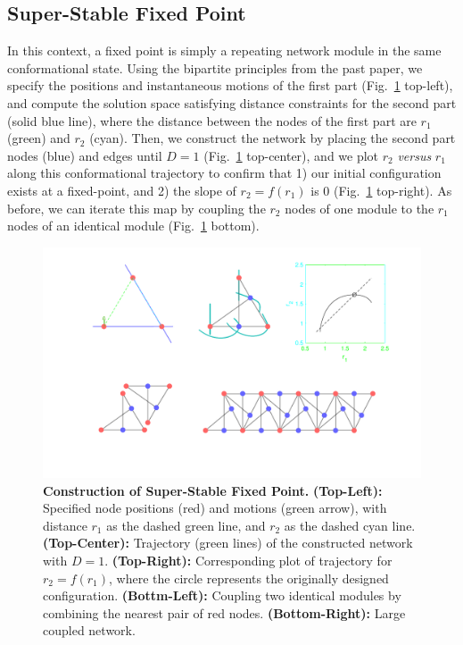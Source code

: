 \documentclass[12pt]{revtex4-1}
\begin{document}
\subsection{Super-Stable Fixed Point}
In this context, a fixed point is simply a repeating network module in the same conformational state. Using the bipartite principles from the past paper, we specify the positions and instantaneous motions of the first part (Fig.~\ref{fig:fixed_point} top-left), and compute the solution space satisfying distance constraints for the second part (solid blue line), where the distance between the nodes of the first part are $r_1$ (green) and $r_2$ (cyan). Then, we construct the network by placing the second part nodes (blue) and edges until $D=1$ (Fig.~\ref{fig:fixed_point} top-center), and we plot $r_2$ \emph{versus} $r_1$ along this conformational trajectory to confirm that 1) our initial configuration exists at a fixed-point, and 2) the slope of $r_2 = f(r_1)$ is 0 (Fig.~\ref{fig:fixed_point} top-right). As before, we can iterate this map by coupling the $r_2$ nodes of one module to the $r_1$ nodes of an identical module (Fig.~\ref{fig:fixed_point} bottom). 


\begin{figure}[h!]
	\centering
	\includegraphics[width=1.0\columnwidth]{fixed_point.pdf}
	\caption{\textbf{Construction of Super-Stable Fixed Point.} \textbf{(Top-Left):} Specified node positions (red) and motions (green arrow), with distance $r_1$ as the dashed green line, and $r_2$ as the dashed cyan line. \textbf{(Top-Center):} Trajectory (green lines) of the constructed network with $D=1$. \textbf{(Top-Right):} Corresponding plot of trajectory for $r_2 = f(r_1)$, where the circle represents the originally designed configuration. \textbf{(Bottm-Left):} Coupling two identical modules by combining the nearest pair of red nodes. \textbf{(Bottom-Right):} Large coupled network.}
	\label{fig:fixed_point}
\end{figure}
\end{document}
